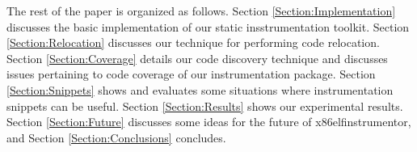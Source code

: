 The rest of the paper is organized as follows. Section
\ref{Section:Implementation} discusses the basic implementation of our static
insstrumentation toolkit. Section \ref{Section:Relocation} discusses our
technique for performing code relocation. Section \ref{Section:Coverage} details
our code discovery technique and discusses issues pertaining to code coverage of
our instrumentation package. Section \ref{Section:Snippets} shows and evaluates
some situations where instrumentation snippets can be useful. Section
\ref{Section:Results} shows our experimental results. Section
\ref{Section:Future} discusses some ideas for the future of x86elfinstrumentor,
and Section \ref{Section:Conclusions} concludes.